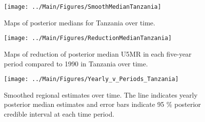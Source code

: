 \documentclass[12pt]{article}\usepackage[]{graphicx}\usepackage[]{color}
\newenvironment{knitrout}{}{} %
\begin{document}
\begin{knitrout}
\color{fgcolor}\begin{figure}[bht]

{\centering \texttt{[image: ../Main/Figures/SmoothMedianTanzania]} 

}

\caption[Maps of posterior medians for Tanzania  over time]{Maps of posterior medians for Tanzania  over time.}\label{fig:unnamed-chunk-304}
\end{figure}


\end{knitrout}
\begin{knitrout}
\color{fgcolor}\begin{figure}[bht]

{\centering \texttt{[image: ../Main/Figures/ReductionMedianTanzania]} 

}

\caption[Maps of reduction of posterior median U5MR in each five-year period compared to 1990 in Tanzania over time]{Maps of reduction of posterior median U5MR in each five-year period compared to 1990 in Tanzania over time.}\label{fig:unnamed-chunk-305}
\end{figure}


\end{knitrout}
\begin{knitrout}
\color{fgcolor}\begin{figure}[bht]

{\centering \texttt{[image: ../Main/Figures/Yearly\_v\_Periods\_Tanzania]} 

}

\caption[Smoothed regional estimates over time]{Smoothed regional estimates over time. The line indicates yearly posterior median estimates and error bars indicate 95 \% posterior credible interval at each time period.}\label{fig:unnamed-chunk-306}
\end{figure}


\end{knitrout}
\end{document}
